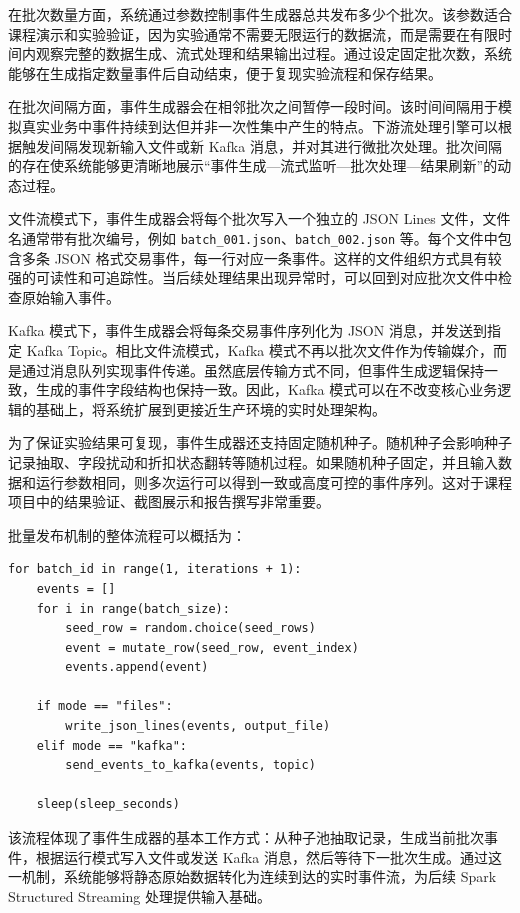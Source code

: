 \documentclass[12pt,hyperref,a4paper,UTF8]{ctexart}
\begin{document}
在批次数量方面，系统通过参数控制事件生成器总共发布多少个批次。该参数适合课程演示和实验验证，因为实验通常不需要无限运行的数据流，而是需要在有限时间内观察完整的数据生成、流式处理和结果输出过程。通过设定固定批次数，系统能够在生成指定数量事件后自动结束，便于复现实验流程和保存结果。

在批次间隔方面，事件生成器会在相邻批次之间暂停一段时间。该时间间隔用于模拟真实业务中事件持续到达但并非一次性集中产生的特点。下游流处理引擎可以根据触发间隔发现新输入文件或新 Kafka 消息，并对其进行微批次处理。批次间隔的存在使系统能够更清晰地展示“事件生成—流式监听—批次处理—结果刷新”的动态过程。

文件流模式下，事件生成器会将每个批次写入一个独立的 JSON Lines 文件，文件名通常带有批次编号，例如 \texttt{batch\_001.json}、\texttt{batch\_002.json} 等。每个文件中包含多条 JSON 格式交易事件，每一行对应一条事件。这样的文件组织方式具有较强的可读性和可追踪性。当后续处理结果出现异常时，可以回到对应批次文件中检查原始输入事件。

Kafka 模式下，事件生成器会将每条交易事件序列化为 JSON 消息，并发送到指定 Kafka Topic。相比文件流模式，Kafka 模式不再以批次文件作为传输媒介，而是通过消息队列实现事件传递。虽然底层传输方式不同，但事件生成逻辑保持一致，生成的事件字段结构也保持一致。因此，Kafka 模式可以在不改变核心业务逻辑的基础上，将系统扩展到更接近生产环境的实时处理架构。

为了保证实验结果可复现，事件生成器还支持固定随机种子。随机种子会影响种子记录抽取、字段扰动和折扣状态翻转等随机过程。如果随机种子固定，并且输入数据和运行参数相同，则多次运行可以得到一致或高度可控的事件序列。这对于课程项目中的结果验证、截图展示和报告撰写非常重要。

批量发布机制的整体流程可以概括为：

\begin{verbatim}
for batch_id in range(1, iterations + 1):
    events = []
    for i in range(batch_size):
        seed_row = random.choice(seed_rows)
        event = mutate_row(seed_row, event_index)
        events.append(event)

    if mode == "files":
        write_json_lines(events, output_file)
    elif mode == "kafka":
        send_events_to_kafka(events, topic)

    sleep(sleep_seconds)
\end{verbatim}

该流程体现了事件生成器的基本工作方式：从种子池抽取记录，生成当前批次事件，根据运行模式写入文件或发送 Kafka 消息，然后等待下一批次生成。通过这一机制，系统能够将静态原始数据转化为连续到达的实时事件流，为后续 Spark Structured Streaming 处理提供输入基础。
\end{document}
